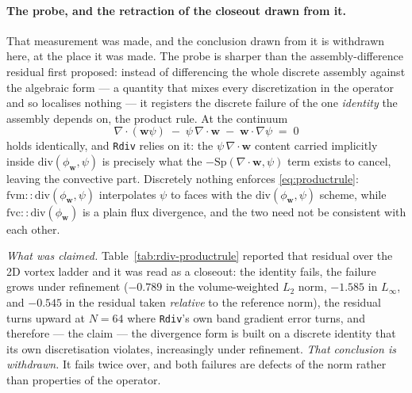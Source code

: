 \documentclass[preprint,3p,11pt]{elsarticle}
\newcommand{\psilev}{\psi}
\begin{document}
\paragraph{The probe, and the retraction of the closeout drawn from it.}
\label{par:rdiv-productrule}
That measurement was made, and the conclusion drawn from it is withdrawn here, at
the place it was made. The probe is sharper than the assembly-difference residual
first proposed: instead of differencing the whole discrete assembly against the
algebraic form --- a quantity that mixes every discretization in the operator and
so localises nothing --- it registers the discrete failure of the one
\emph{identity} the assembly depends on, the product rule. At the continuum
\begin{equation}
  \nabla\cdot(\mathbf{w}\psilev)
  \;-\; \psilev\,\nabla\cdot\mathbf{w}
  \;-\; \mathbf{w}\cdot\nabla\psilev \;=\; 0
  \label{eq:productrule}
\end{equation}
holds identically, and \texttt{Rdiv} relies on it: the
$\psilev\,\nabla\cdot\mathbf{w}$ content carried implicitly inside
$\mathrm{div}(\phi_{\mathbf{w}},\psilev)$ is precisely what the
$-\mathrm{Sp}(\nabla\cdot\mathbf{w},\psilev)$ term exists to cancel, leaving the
convective part. Discretely nothing enforces \eqref{eq:productrule}:
$\mathrm{fvm::div}(\phi_{\mathbf{w}},\psilev)$ interpolates $\psilev$ to faces
with the $\mathrm{div}(\phi_{\mathbf{w}},\psilev)$ scheme, while
$\mathrm{fvc::div}(\phi_{\mathbf{w}})$ is a plain flux divergence, and the two
need not be consistent with each other.

\emph{What was claimed.} Table~\ref{tab:rdiv-productrule} reported that residual
over the 2D vortex ladder and it was read as a closeout: the identity fails, the
failure grows under refinement ($-0.789$ in the volume-weighted $L_2$ norm,
$-1.585$ in $L_\infty$, and $-0.545$ in the residual taken \emph{relative} to the
reference norm), the residual turns upward at $N=64$ where \texttt{Rdiv}'s own
band gradient error turns, and therefore --- the claim --- the divergence form is
built on a discrete identity that its own discretisation violates, increasingly
under refinement. \emph{That conclusion is withdrawn.} It fails twice over, and
both failures are defects of the norm rather than properties of the operator.
\end{document}
